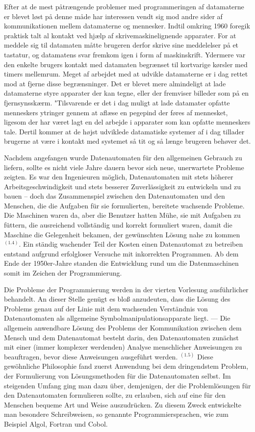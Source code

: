 {Efter at de mest påtrængende problemer med programmeringen af datamaterne er blevet løst på denne måde har interessen vendt sig mod andre sider af kommunikationen mellem datamaterne og mennesker. Indtil omkring 1960 foregik praktisk talt al kontakt ved hjælp af skrivemaskinelignende apparater. For at meddele sig til datamaten måtte brugeren derfor skrive sine meddelelser på et tastatur, og datamatens svar fremkom igen i form af maskinskrift. Ydermere var den enkelte brugers kontakt med datamaten begrænset til kortvarige kørsler med timers mellemrum. Meget af arbejdet med at udvikle datamaterne er i dag rettet mod at fjerne disse begrænsninger. Det er blevet mere almindeligt at lade datamaterne styre apparater der kan tegne, eller der fremviser billeder som på en fjernsynsskærm. "Tilsvarende er det i dag muligt at lade datamater opfatte menneskers ytringer gennem at aflæse en pegepind der føres af mennesket, ligesom der har været lagt en del arbejde i apparater som kan opfatte menneskers tale. Dertil kommer at de højst udviklede datamatiske systemer af i dag tillader brugerne at være i kontakt med systemet så tit og så længe brugeren behøver det. 
}{
Nachdem angefangen wurde Datenautomaten für den allgemeinen Gebrauch zu liefern, sollte es nicht viele Jahre dauern bevor sich neue, unerwartete Probleme zeigten.
Es war den Ingenieuren möglich, Datenautomaten mit stets höherer Arbeitsgeschwindigkeit und stets besserer Zuverlässigkeit zu entwickeln und zu bauen -- doch das Zusammenspiel zwischen den Datenautomaten und den Menschen, die die Aufgaben für sie formulierten, bereitete wachsende Probleme. Die Maschinen waren da, aber die Benutzer hatten Mühe, sie mit Aufgaben zu füttern, die ausreichend vollständig und korrekt formuliert waren, damit die Maschine die Gelegenheit bekamen, der gewünschten Lösung nahe zu kommen $^{(1.4)}$.
Ein ständig wachender Teil der Kosten einen Datenautomat zu betreiben entstand aufgrund erfolgloser Versuche mit inkorrekten Programmen. Ab dem Ende der 1950er-Jahre standen die Entwicklung rund um die Datenmaschinen somit im Zeichen der Programmierung.

Die Probleme der Programmierung werden in der vierten Vorlesung ausführlicher behandelt. An dieser Stelle genügt es bloß anzudeuten, dass die Lösung des Problems genau auf der Linie mit dem wachsenden Verständnis von Datenautomaten als allgemeine Symbolmanipulationsapparate liegt. — Die  allgemein anwendbare Lösung des Problems der Kommunikation zwischen dem Mensch und dem Datenautomat besteht darin, den Datenautomaten zunächst mit einer (immer komplexer werdenden) Analyse menschlicher Anweisungen zu beauftragen, bevor diese Anweisungen ausgeführt werden. $^{(1.5)}$ Diese gewöhnliche Philosophie fand zuerst Anwendung bei dem dringendstem Problem, der Formulierung von Lösungsmethoden für die Datenautomaten selbst. Im steigenden Umfang ging man dazu über, demjenigen, der die Problemlösungen für den Datenautomaten formulieren sollte, zu erlauben, sich auf eine für den Menschen bequeme Art und Weise auszudrücken. Zu diesem Zweck entwickelte man besondere Schreibweisen, so genannte Programmiersprachen, wie zum Beispiel Algol, Fortran und Cobol.

}
